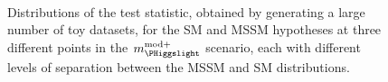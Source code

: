 \begin{figure}[h!]
\begin{center}
~\\
\end{center}
\caption[Distributions of the test statistic for the SM and MSSM hypotheses at three different points in the $m_{\PHiggslight}^{\text{mod+}}$ scenario.]{Distributions of the test statistic, obtained by generating a large number of toy datasets, for the \ac{SM} and \ac{MSSM} hypotheses at three different points in the $m_{\PHiggslight}^{\text{mod+}}$
scenario, each with different levels of separation between the \ac{MSSM} and \ac{SM} distributions.}
\label{fig:mssm_mssmvssm_toys}
\end{figure}

